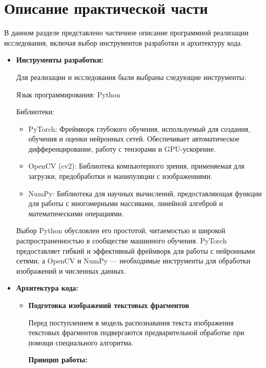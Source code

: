 \section{Описание практической части}
\label{sec:Chapter4} 

В данном разделе представлено частичное описание программной реализации исследования, включая выбор инструментов разработки и архитектуру кода.

\begin{itemize}
    \item \textbf{Инструменты разработки:}
    
    Для реализации и исследования были выбраны следующие инструменты:

    Язык программирования: Python 
    
    Библиотеки:

    \begin{itemize}
        \item PyTorch: Фреймворк глубокого обучения, используемый для создания, обучения и оценки нейронных сетей. Обеспечивает автоматическое дифференцирование, работу с тензорами и GPU-ускорение.
        \item OpenCV (cv2): Библиотека компьютерного зрения, применяемая для загрузки, предобработки и манипуляции с изображениями.
        \item NumPy: Библиотека для научных вычислений, предоставляющая функции для работы с многомерными массивами, линейной алгеброй и математическими операциями.
    \end{itemize}
    Выбор Python обусловлен его простотой, читаемостью и широкой распространенностью в сообществе машинного обучения. PyTorch предоставляет гибкий и эффективный фреймворк для работы с нейронными сетями, а OpenCV и NumPy —  необходимые инструменты для обработки изображений и численных данных. 

    \item  \textbf{Архитектура кода:}

    \begin{itemize}

        \item  \textbf{Подготовка изображений текстовых фрагментов }

        Перед поступлением в модель распознавания текста изображения текстовых фрагментов подвергаются предварительной обработке при помощи специального алгоритма.
        
        \textbf{Принцип работы:}
        


\end{itemize}
\end{itemize}
